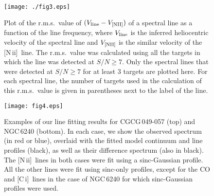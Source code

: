 \documentclass[preprint]{aastex}
\newcommand{\CI}{[C\,{\sc i}]}
\newcommand{\NII}{\mbox{[N\,{\sc ii}]}}
\begin{document}




\begin{figure}
\centering
\texttt{[image: ./fig3.eps]}
\caption{
Plot of the r.m.s.~value of $(V_{\rm line} -V_{\rm [NII]})$ of a spectral line as a function of 
the line frequency, where $V_{\rm line}$ is the inferred heliocentric velocity of the spectral 
line and 
$V_{\rm [NII]}$ is the similar velocity of the \NII\ line.  The r.m.s.~value was calculated using 
all the targets in which the line was detected at $S/N \geqslant 7$. Only the spectral lines that
were detected at $S/N \geqslant 7$ for at least 3 targets are plotted here. For each spectral line, 
the number of targets used in the calculation of this r.m.s.~value is given in parentheses next 
to the label of the line.
}
\label{Fig3}
\end{figure}



\clearpage






\begin{landscape}

\begin{figure}
\centering
\texttt{[image: fig4.eps]}
\caption{
Examples of our line fitting results for CGCG\,049-057 (top) and NGC\,6240 (bottom). In each case, 
we show the observed spectrum (in red or blue), overlaid with the fitted model continuum and 
line profiles (black), as well as their difference spectrum (also in black).  The \NII\ lines 
in both cases were fit using a sinc-Gaussian profile. All the other lines were fit using sinc-only 
profiles, except for the CO and \CI\ lines in the case of NGC\,6240 for which sinc-Gaussian 
profiles were used. 
}
\label{Fig4}
\end{figure}


\end{landscape}
\clearpage
\end{document}
